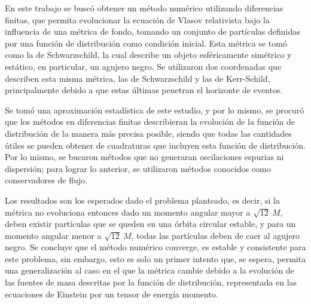 \documentclass[11pt,twoside,openright,spanish]{report}
\numberwithin{equation}{chapter}
\numberwithin{figure}{chapter}
\numberwithin{table}{chapter}
\renewcommand{\footrulewidth}{0pt}
\renewcommand{\headrulewidth}{0.1pt}
\begin{document}
\begin{preface}
%	

En este trabajo se buscó obtener un método numérico utilizando diferencias finitas, que permita evolucionar la ecuación de Vlasov relativista bajo la influencia de una métrica de fondo, tomando un conjunto de partículas definidas por una función de distribución como condición inicial. Esta métrica se tomó como la de Schwarzschild, la cual describe un objeto esféricamente simétrico y estático, en particular, un agujero negro. Se utilizaron dos coordenadas que describen esta misma métrica, las de Schwarzschild y las de Kerr-Schild, principalmente debido a que estas últimas penetran el horizonte de eventos. 

Se tomó una aproximación estadística de este estudio, y por lo mismo, se procuró que los métodos en diferencias finitas describieran la evolución de la función de distribución de la manera más precisa posible, siendo que todas las cantidades útiles se pueden obtener de cuadraturas que incluyen esta función de distribución. Por lo mismo, se bucaron métodos que no generaran oscilaciones espurias ni dispersión; para lograr lo anterior, se utilizaron métodos conocidos como conservadores de flujo.

Los resultados son los esperados dado el problema planteado, es decir, si la métrica no evoluciona entonces dado un momento angular mayor a $\sqrt{12}\ M$, deben existir partículas que se queden en una órbita circular estable, y para un momento angular menor a $\sqrt{12}\ M$, todas las partículas deben de caer al agujero negro. Se concluye que el método numérico converge, es estable y consistente para este problema, sin embargo, esto es solo un primer intento que, se espera, permita una generalización al caso en el que la métrica cambie debido a la evolución de las fuentes de masa descritas por la función de distribución, representada en las ecuaciones de Einstein por un tensor de energía momento.
\end{preface}


\fancypagestyle{plain}{
	\fancyhead[L]{}
	\fancyhead[C]{}
	\fancyhead[R]{}
	
	\fancyfoot[L]{}
	\fancyfoot[C]{\thepage}
	\fancyfoot[R]{}
	\renewcommand{\headrulewidth}{0pt}
	\renewcommand{\footrulewidth}{0pt}
}

\fancyhead[LE]{\scshape\thepage\hspace{1cm}\footnotesize\nouppercase{\leftmark}}
\fancyhead[LO]{}
\fancyhead[RE]{}
\pagestyle{fancy}
\cleardoublepage
\end{document}
